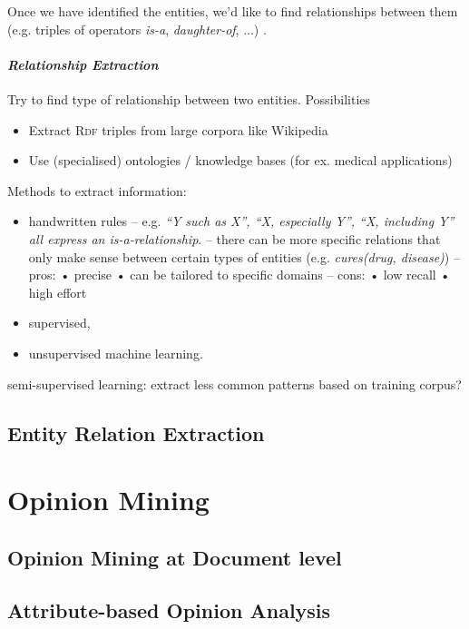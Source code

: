 \documentclass[10pt,twocolumn]{article}
\begin{document}
Once we have identified the entities, we'd like to find relationships between
them (e.g. triples of operators \textit{is-a}, \textit{daughter-of}, ...)
.

\paragraph{\textit{Relationship Extraction}} Try to find type of relationship
between two entities. Possibilities
\begin{itemize}
\item Extract \textsc{Rdf} triples from large corpora like Wikipedia
\item Use (specialised) ontologies / knowledge bases (for ex. medical applications)
\end{itemize}
Methods to extract information:
\begin{itemize}
\item handwritten rules -- e.g. \textit{``Y such as X'', ``X, especially Y'',
    ``X, including Y'' all express an \textit{is-a}-relationship}. -- there can
  be more specific relations that only make sense between certain types of
  entities (e.g. \textit{cures(drug, disease)}) -- pros:  • precise  • can be
  tailored to specific domains -- cons:  • low recall  • high effort
\item supervised,
\item unsupervised machine learning.
\end{itemize}

semi-supervised learning: extract less common patterns based on training corpus?

\subsection{Entity Relation Extraction}

\section{Opinion Mining}

\subsection{Opinion Mining at Document level}

\subsection{Attribute-based Opinion Analysis}
\end{document}
